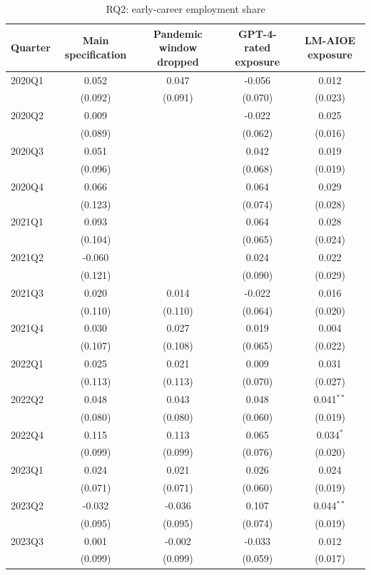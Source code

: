 \begin{table}[htbp]\centering
\caption{RQ2: early-career employment share}
\begin{tabular}{lcccc}
\toprule
Quarter & Main specification & Pandemic window dropped & GPT-4-rated exposure & LM-AIOE exposure \\
\midrule
2020Q1 & 0.052 & 0.047 & -0.056 & 0.012 \\
 & (0.092) & (0.091) & (0.070) & (0.023) \\
2020Q2 & 0.009 &  & -0.022 & 0.025 \\
 & (0.089) &  & (0.062) & (0.016) \\
2020Q3 & 0.051 &  & 0.042 & 0.019 \\
 & (0.096) &  & (0.068) & (0.019) \\
2020Q4 & 0.066 &  & 0.064 & 0.029 \\
 & (0.123) &  & (0.074) & (0.028) \\
2021Q1 & 0.093 &  & 0.064 & 0.028 \\
 & (0.104) &  & (0.065) & (0.024) \\
2021Q2 & -0.060 &  & 0.024 & 0.022 \\
 & (0.121) &  & (0.090) & (0.029) \\
2021Q3 & 0.020 & 0.014 & -0.022 & 0.016 \\
 & (0.110) & (0.110) & (0.064) & (0.020) \\
2021Q4 & 0.030 & 0.027 & 0.019 & 0.004 \\
 & (0.107) & (0.108) & (0.065) & (0.022) \\
2022Q1 & 0.025 & 0.021 & 0.009 & 0.031 \\
 & (0.113) & (0.113) & (0.070) & (0.027) \\
2022Q2 & 0.048 & 0.043 & 0.048 & 0.041$^{**}$ \\
 & (0.080) & (0.080) & (0.060) & (0.019) \\
2022Q4 & 0.115 & 0.113 & 0.065 & 0.034$^{*}$ \\
 & (0.099) & (0.099) & (0.076) & (0.020) \\
2023Q1 & 0.024 & 0.021 & 0.026 & 0.024 \\
 & (0.071) & (0.071) & (0.060) & (0.019) \\
2023Q2 & -0.032 & -0.036 & 0.107 & 0.044$^{**}$ \\
 & (0.095) & (0.095) & (0.074) & (0.019) \\
2023Q3 & 0.001 & -0.002 & -0.033 & 0.012 \\
 & (0.099) & (0.099) & (0.059) & (0.017) \\

\end{tabular}
\end{table}
